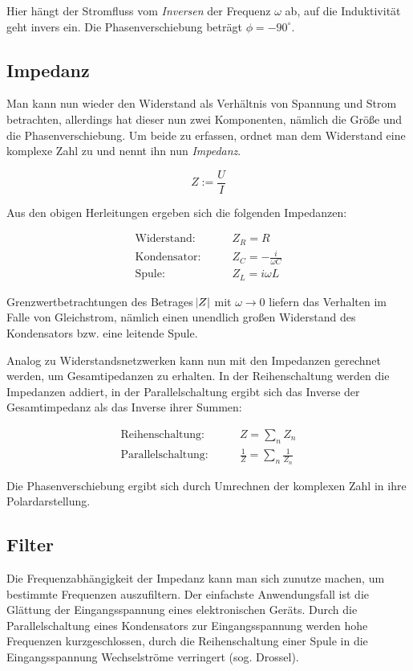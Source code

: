 Hier hängt der Stromfluss vom \textit{Inversen} der Frequenz $\omega$ ab, auf
die Induktivität geht invers ein. Die Phasenverschiebung beträgt $\phi =
-90^\circ$.

\subsection{Impedanz}

Man kann nun wieder den Widerstand als Verhältnis von Spannung und Strom
betrachten, allerdings hat dieser nun zwei Komponenten, nämlich die Größe und
die Phasenverschiebung. Um beide zu erfassen, ordnet man dem Widerstand eine
komplexe Zahl zu und nennt ihn nun \textit{Impedanz}.

\begin{equation}
  Z := \frac{U}{I}
\end{equation}

Aus den obigen Herleitungen ergeben sich die folgenden Impedanzen:

\begin{align}
  \text{Widerstand:}  \qquad & Z_R = R \\
  \text{Kondensator:} \qquad & Z_C = -\frac{i}{\omega C} \\
  \text{Spule:}       \qquad & Z_L = i \omega L
\end{align}

Grenzwertbetrachtungen des Betrages $\envert{Z}$ mit $\omega \to 0$ liefern das
Verhalten im Falle von Gleichstrom, nämlich einen unendlich großen Widerstand
des Kondensators bzw.  eine leitende Spule.

Analog zu Widerstandsnetzwerken kann nun mit den Impedanzen gerechnet werden,
um Gesamtipedanzen zu erhalten. In der Reihenschaltung werden die Impedanzen
addiert, in der Parallelschaltung ergibt sich das Inverse der Gesamtimpedanz
als das Inverse ihrer Summen:

\begin{align}
  \text{Reihenschaltung:}   \qquad & Z = \sum_n Z_n\\
  \text{Parallelschaltung:} \qquad & \frac{1}{Z} = \sum_n \frac{1}{Z_n}
\end{align}

Die Phasenverschiebung ergibt sich durch Umrechnen der komplexen Zahl in ihre
Polardarstellung.

\subsection{Filter}
Die Frequenzabhängigkeit der Impedanz kann man sich zunutze machen, um
bestimmte Frequenzen auszufiltern. Der einfachste Anwendungsfall ist die
Glättung der Eingangsspannung eines elektronischen Geräts. Durch die
Parallelschaltung eines Kondensators zur Eingangsspannung werden hohe
Frequenzen kurzgeschlossen, durch die Reihenschaltung einer Spule in die
Eingangsspannung Wechselströme verringert (sog. Drossel).

